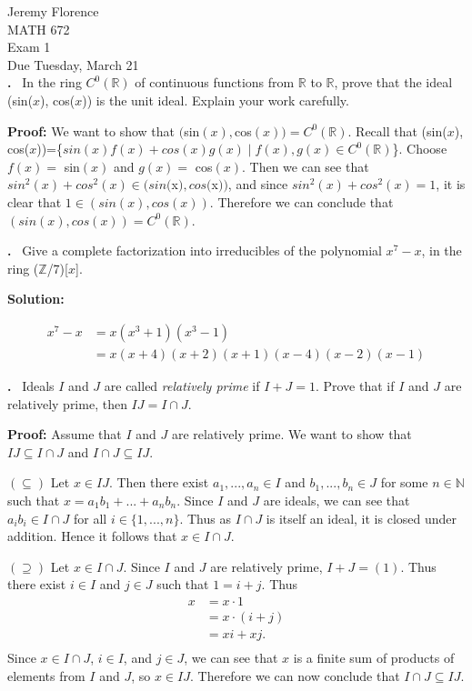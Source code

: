 \documentclass{article}
\newcounter{problem}
\newcounter{solution}
\newcommand\Problem{%
  \stepcounter{problem}%
  \textbf{\theproblem.}~%
  \setcounter{solution}{0}%
}
\newcommand\TheSolution{%
  \textbf{Solution:} %
}
\newcommand\Proof{%
	\textbf{Proof:} %
}
\begin{document}
Jeremy Florence\\
MATH 672\\
Exam 1\\
Due Tuesday, March 21\\


\Problem In the ring $C^0(\mathbb{R})$ of continuous functions from $\mathbb{R}$ to $\mathbb{R}$, prove that the ideal (sin($x$), cos($x$)) is the unit ideal. Explain your work carefully.

\Proof We want to show that $($sin$(x), $cos$(x))=C^0(\mathbb{R})$. Recall that (sin($x$), cos($x$))=\{$sin(x)f(x)+cos(x)g(x)\mid f(x),g(x) \in C^0(\mathbb{R}) $\}. Choose $f(x)=$ sin$(x)$ and $g(x)=$ cos$(x)$. Then we can see that $sin^2(x)+cos^2(x) \in (sin($x$), cos($x$))$, and since $sin^2(x)+cos^2(x)=1$, it is clear that $1 \in (sin(x), cos(x))$. Therefore we can conclude that $(sin(x), cos(x))=C^0(\mathbb{R})$.

\Problem Give a complete factorization into irreducibles of the polynomial $x^7-x$, in the ring ($\mathbb{Z}$/7)[$x$].

\TheSolution
\[
    \begin{split}
        x^7-x &= x(x^3+1)(x^3-1)\\
        		&= x(x+4)(x+2)(x+1)(x-4)(x-2)(x-1)
    \end{split}
\]

\Problem Ideals $I$ and $J$ are called \emph{relatively prime} if $I+J=1$. Prove that if $I$ and $J$ are relatively prime, then $IJ=I \cap J$.

\Proof Assume that $I$ and $J$ are relatively prime. We want to show that $IJ \subseteq I \cap J$ and $I \cap J \subseteq IJ$. 

$(\subseteq)$ Let $x \in IJ$. Then there exist $a_1, ..., a_n \in I$ and $b_1, ..., b_n \in J$ for some $n \in \mathbb{N}$ such that $x=a_1b_1+ ... + a_nb_n$. Since $I$ and $J$ are ideals, we can see that $a_ib_i \in I \cap J$ for all $i \in \{1, ..., n\}$. Thus as $I \cap J$ is itself an ideal, it is closed under addition. Hence it follows that $x \in I \cap J$.

$(\supseteq)$ Let $x \in I \cap J$. Since $I$ and $J$ are relatively prime, $I+J=(1)$. Thus there exist $i \in I$ and $j \in J$ such that $1=i+j$. Thus 
\[
	\begin{split}
		x &= x \cdot 1\\
			&= x \cdot (i+j)\\
			&= xi+xj.\\
	\end{split}
\]
Since $x \in I \cap J$, $i \in I$, and $j \in J$, we can see that $x$ is a finite sum of products of elements from $I$ and $J$, so $x \in IJ$. Therefore we can now conclude that $I \cap J \subseteq IJ$.
\end{document}
